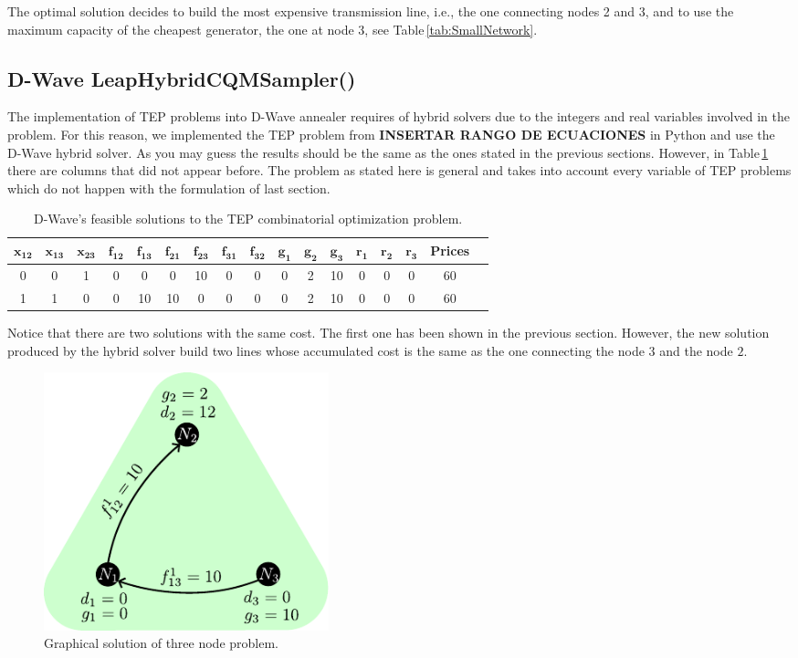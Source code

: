 The optimal solution decides to build the most expensive transmission line, i.e., the one connecting nodes 2 and 3, and to use the maximum capacity of the cheapest generator, the one at node 3, see Table\,\ref{tab:SmallNetwork}.
\subsection{D-Wave LeapHybridCQMSampler()}
The implementation of TEP problems into D-Wave annealer requires of hybrid solvers due to the integers and real variables involved in the problem. For this reason, we implemented the  TEP problem from \textbf{INSERTAR RANGO DE ECUACIONES} in Python and use the D-Wave hybrid solver. As you may guess the results should be the same as the ones stated in the previous sections. However, in Table\,\ref{tab:SmallNetworkResultsHybrid} there are columns that did not appear before. The problem as stated here is general and takes into account every variable of TEP problems which do not happen with the formulation of last section.
 \begin{table}[H]
\centering
\begin{tabular}{ |c|c|c|c|c|c|c|c|c|c|c|c|c|c|c|c|c| }
  \hline			
  $\mathbf{x_{12}}$ & $\mathbf{x_{13}}$ & $\mathbf{x_{23}}$ & $\mathbf{f_{12}}$ & $\mathbf{f_{13}}$ & $\mathbf{f_{21}}$ & $\mathbf{f_{23}}$ & $\mathbf{f_{31}}$ & $\mathbf{f_{32}}$ &$\mathbf{g_{1}}$ & $\mathbf{g_{2}}$ & $\mathbf{g_{3}}$ & $\mathbf{r_{1}}$ & $\mathbf{r_{2}}$ & $\mathbf{r_{3}}$ &  \textbf{Prices} \\
  \hline
    0 & 0 & 1 & 0 & 0 & 0 & 10 & 0 & 0 & 0 & 2 & 10 & 0 & 0 & 0 & 60 \\
  \hline
  1 & 1 & 0 & 0 & 10 & 10 & 0 & 0 & 0 & 0 & 2 & 10 & 0 & 0 & 0 & 60 \\
  \hline
\end{tabular}
\caption{D-Wave's feasible solutions to the TEP combinatorial optimization problem.}
\label{tab:SmallNetworkResultsHybrid}
\end{table}
Notice that there are two solutions with the same cost. The first one has been shown in the previous section. However, the new solution produced by the hybrid solver build two lines whose accumulated cost is the same as the one connecting the node $3$ and the node $2$.
\begin{figure}[H]
  \begin{center}
\includegraphics[width=0.4\textwidth]{Figures/3NodeGreenHybrid.pdf}
  \end{center}
  \caption{Graphical solution of three node problem.}
  \label{fig: Green_final_Hybrid}
\end{figure}


